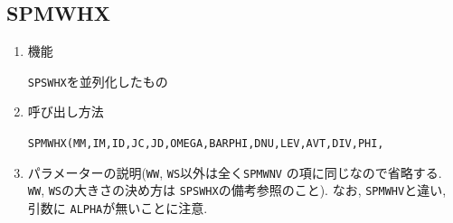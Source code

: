 
\subsection{SPMWHX}

\begin{enumerate}

\item 機能

{\tt SPSWHX}を並列化したもの

\item 呼び出し方法 

{\tt SPMWHX(MM,IM,ID,JC,JD,OMEGA,BARPHI,DNU,LEV,AVT,DIV,PHI,}\\
\hspace*{10em}{\tt DAVT,DDIV,DPHI,RN,IRM,IT,T,Y,IP,P,R,IA,A,Q,WS,WW,W)}

\item パラメーターの説明({\tt WW}, {\tt WS}以外は全く{\tt SPMWNV}
の項に同じなので省略する. {\tt WW}, {\tt WS}の大きさの決め方は
{\tt SPSWHX}の備考参照のこと). なお, {\tt SPMWHV}と違い, 引数に
{\tt ALPHA}が無いことに注意.

\end{enumerate}



